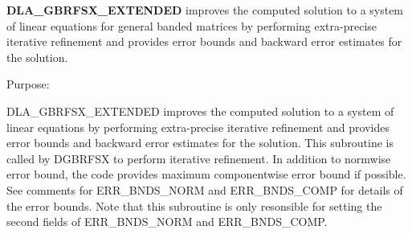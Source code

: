 {\bfseries D\+L\+A\+\_\+\+G\+B\+R\+F\+S\+X\+\_\+\+E\+X\+T\+E\+N\+D\+E\+D} improves the computed solution to a system of linear equations for general banded matrices by performing extra-\/precise iterative refinement and provides error bounds and backward error estimates for the solution. 

 \begin{DoxyParagraph}{Purpose\+: }
\begin{DoxyVerb} DLA_GBRFSX_EXTENDED improves the computed solution to a system of
 linear equations by performing extra-precise iterative refinement
 and provides error bounds and backward error estimates for the solution.
 This subroutine is called by DGBRFSX to perform iterative refinement.
 In addition to normwise error bound, the code provides maximum
 componentwise error bound if possible. See comments for ERR_BNDS_NORM
 and ERR_BNDS_COMP for details of the error bounds. Note that this
 subroutine is only resonsible for setting the second fields of
 ERR_BNDS_NORM and ERR_BNDS_COMP.\end{DoxyVerb}
 
\end{DoxyParagraph}

